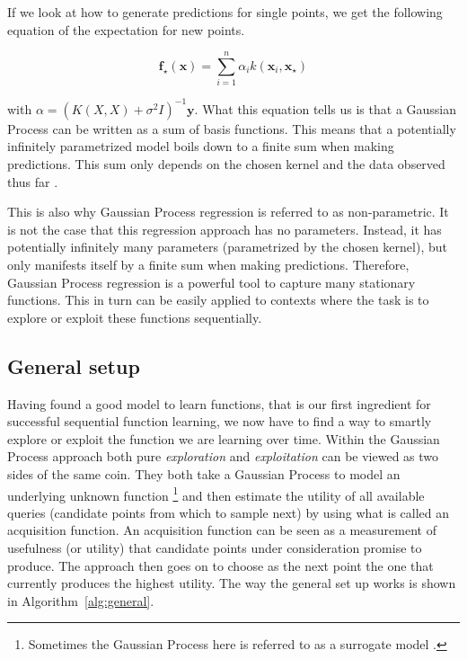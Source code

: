 \documentclass[authoryear,11pt,review]{elsarticle}
\begin{document}
If we look at how to generate predictions for single points, we get the following equation of the expectation for new points.

\begin{equation*}
\mathbf{f}_\star(\mathbf{x})=\sum_{i=1}^{n}\alpha_{i}k(\mathbf{x}_i,\mathbf{x}_\star)
\end{equation*}

with $\alpha=\left(K(X,X)+\sigma^2I\right)^{-1}\mathbf{y}$.
What this equation tells us is that a Gaussian Process can be written as a sum of basis functions. This means that a potentially infinitely parametrized model boils down to a finite sum when making predictions. This sum only depends on the chosen kernel and the data observed thus far \citep{kac1947explicit}. 

This is also why Gaussian Process regression is referred to as non-parametric. It is not the case that this regression approach has no parameters. Instead, it has potentially infinitely many parameters (parametrized by the chosen kernel), but only manifests itself by a finite sum when making predictions. Therefore, Gaussian Process regression is a powerful tool to capture many stationary functions. This in turn can be easily applied to contexts where the task is to explore or exploit these functions sequentially.

\subsection{General setup}
Having found a good model to learn functions, that is our first ingredient for successful sequential function learning, we now have to find a way to smartly explore or exploit the function we are learning over time. Within  the Gaussian Process approach both pure \emph{exploration} and \emph{exploitation} can be viewed as two sides of the same coin. They both take a Gaussian Process to model an underlying unknown function \footnote{Sometimes the Gaussian Process here is referred to as a surrogate model \citep{gramacy2008bayesian}.} and then estimate the utility of all available queries (candidate points from which to sample next) by using what is called an acquisition function. An acquisition function can be seen as a measurement of usefulness (or utility) that candidate points under consideration promise to produce. The approach then goes on to choose as the next point the one that currently produces the highest utility. The way the general set up works is shown in Algorithm~\ref{alg:general}.
\end{document}
